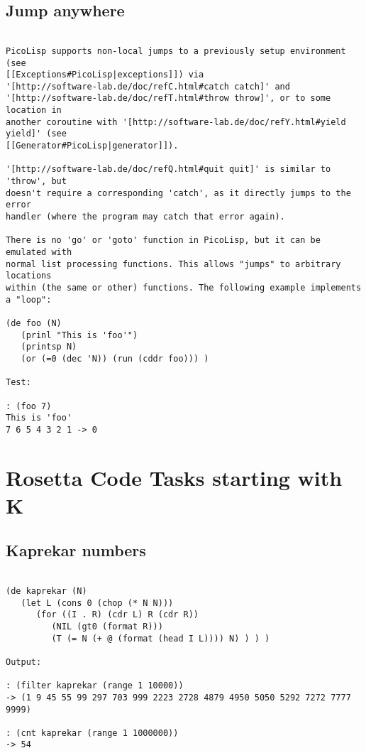 \section*{Jump anywhere}

\begin{verbatim}

PicoLisp supports non-local jumps to a previously setup environment (see
[[Exceptions#PicoLisp|exceptions]]) via
'[http://software-lab.de/doc/refC.html#catch catch]' and
'[http://software-lab.de/doc/refT.html#throw throw]', or to some location in
another coroutine with '[http://software-lab.de/doc/refY.html#yield yield]' (see
[[Generator#PicoLisp|generator]]).

'[http://software-lab.de/doc/refQ.html#quit quit]' is similar to 'throw', but
doesn't require a corresponding 'catch', as it directly jumps to the error
handler (where the program may catch that error again).

There is no 'go' or 'goto' function in PicoLisp, but it can be emulated with
normal list processing functions. This allows "jumps" to arbitrary locations
within (the same or other) functions. The following example implements a "loop":

(de foo (N)
   (prinl "This is 'foo'")
   (printsp N)
   (or (=0 (dec 'N)) (run (cddr foo))) )

Test:

: (foo 7)
This is 'foo'
7 6 5 4 3 2 1 -> 0

\end{verbatim}

\chapter{Rosetta Code Tasks starting with K}

\section*{Kaprekar numbers}

\begin{verbatim}

(de kaprekar (N)
   (let L (cons 0 (chop (* N N)))
      (for ((I . R) (cdr L) R (cdr R))
         (NIL (gt0 (format R)))
         (T (= N (+ @ (format (head I L)))) N) ) ) )

Output:

: (filter kaprekar (range 1 10000))
-> (1 9 45 55 99 297 703 999 2223 2728 4879 4950 5050 5292 7272 7777 9999)

: (cnt kaprekar (range 1 1000000))
-> 54

\end{verbatim}

